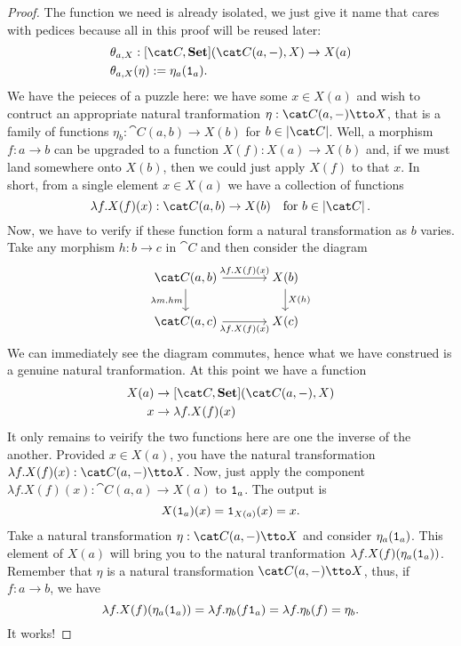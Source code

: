 \begin{proof}
The function we need is already isolated, we just give it name that cares with pedices because all in this proof will be reused later:
%
\[\begin{aligned}
& \theta_{a, X} : [\cat C, \Set](\cat C(a, -), X) \to X(a) \\
& \theta_{a, X}(\eta) := \eta_a(\id_a) .
\end{aligned}\]
%
We have the peieces of a puzzle here: we have some \(x \in X(a)\) and wish to contruct an appropriate natural tranformation \(\eta : \cat C(a, -) \tto X\), that is a family of functions \(\eta_b : \cat C(a, b) \to X(b)\) for \(b \in \obj{\cat C}\). Well, a morphism \(f : a \to b\) can be upgraded to a function \(X(f) : X(a) \to X(b)\) and, if we must land somewhere onto \(X(b)\), then we could just apply \(X(f)\) to that \(x\). In short, from a single element \(x \in X(a)\) we have a collection of functions
\[\lambda f . X(f)(x) : \cat C(a, b) \to X(b) \quad \text{for } b \in \obj{\cat C} .\]
Now, we have to verify if these function form a natural transformation as \(b\) varies. Take any morphism \(h : b \to c\) in \(\cat C\) and then consider the diagram
\[\begin{tikzcd}[column sep=large]
  \cat C(a, b) \ar["{\lambda m . hm}", d, swap] \ar["{\lambda f . X(f)(x)}", r] & X(b) \ar["{X(h)}", d] \\
\cat C(a, c) \ar["{\lambda f . X(f)(x)}", r, swap] & X(c)
\end{tikzcd}\]
We can immediately see the diagram commutes, hence what we have construed is a genuine natural tranformation. At this point we have a function
\[\begin{aligned}
  X(a) &\to [\cat C, \Set](\cat C(a, -), X) \\
  x    &\to \lambda f . X(f)(x)
\end{aligned}\]
It only remains to veirify the two functions here are one the inverse of the another. Provided \(x \in X(a)\), you have the natural transformation \(\lambda f . X(f)(x) : \cat C(a, -) \tto X\). Now, just apply the component \(\lambda f . X(f)(x) : \cat C(a, a) \to X(a)\) to \(\mathtt 1_a\). The output is
\[X(\mathtt 1_a)(x) = \mathtt 1_{X(a)} (x) = x .\] 
Take a natural transformation \(\eta : \cat C(a, -) \tto X\) and consider \(\eta_a (\mathtt 1_a)\). This element of \(X(a)\) will bring you to the natural tranformation \(\lambda f . X(f) (\eta_a(\mathtt 1_a))\). Remember that \(\eta\) is a natural transformation \(\cat C (a, -) \tto X\), thus, if \(f : a \to b\), we have
\[\lambda f . X(f)(\eta_a(\mathtt 1_a)) = \lambda f . \eta_b(f\mathtt 1_a) = \lambda f . \eta_b (f) = \eta_b .\]
It works!
\end{proof}

